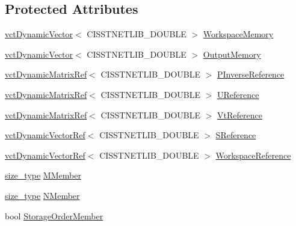 \subsection*{Protected Attributes}
\begin{DoxyCompactItemize}
\item 
\hyperlink{classvct_dynamic_vector}{vct\+Dynamic\+Vector}$<$ C\+I\+S\+S\+T\+N\+E\+T\+L\+I\+B\+\_\+\+D\+O\+U\+B\+L\+E $>$ \hyperlink{classnmr_p_inverse_dynamic_data_a799d81175e96446fe8ab3553befd26ee}{Workspace\+Memory}
\item 
\hyperlink{classvct_dynamic_vector}{vct\+Dynamic\+Vector}$<$ C\+I\+S\+S\+T\+N\+E\+T\+L\+I\+B\+\_\+\+D\+O\+U\+B\+L\+E $>$ \hyperlink{classnmr_p_inverse_dynamic_data_ac1c4149267a493ae2077a77ebe33224a}{Output\+Memory}
\end{DoxyCompactItemize}
{\bf }\par
\begin{DoxyCompactItemize}
\item 
\hyperlink{classvct_dynamic_matrix_ref}{vct\+Dynamic\+Matrix\+Ref}$<$ C\+I\+S\+S\+T\+N\+E\+T\+L\+I\+B\+\_\+\+D\+O\+U\+B\+L\+E $>$ \hyperlink{classnmr_p_inverse_dynamic_data_a14a45576194a4b72f980276df04b3fd8}{P\+Inverse\+Reference}
\item 
\hyperlink{classvct_dynamic_matrix_ref}{vct\+Dynamic\+Matrix\+Ref}$<$ C\+I\+S\+S\+T\+N\+E\+T\+L\+I\+B\+\_\+\+D\+O\+U\+B\+L\+E $>$ \hyperlink{classnmr_p_inverse_dynamic_data_a6241a303eaf9bfaf0d0c705690855d55}{U\+Reference}
\item 
\hyperlink{classvct_dynamic_matrix_ref}{vct\+Dynamic\+Matrix\+Ref}$<$ C\+I\+S\+S\+T\+N\+E\+T\+L\+I\+B\+\_\+\+D\+O\+U\+B\+L\+E $>$ \hyperlink{classnmr_p_inverse_dynamic_data_a7e7d03c38c284a81d84ba35383acf594}{Vt\+Reference}
\item 
\hyperlink{classvct_dynamic_vector_ref}{vct\+Dynamic\+Vector\+Ref}$<$ C\+I\+S\+S\+T\+N\+E\+T\+L\+I\+B\+\_\+\+D\+O\+U\+B\+L\+E $>$ \hyperlink{classnmr_p_inverse_dynamic_data_a7d2da272cbc56f92c25264181b319330}{S\+Reference}
\item 
\hyperlink{classvct_dynamic_vector_ref}{vct\+Dynamic\+Vector\+Ref}$<$ C\+I\+S\+S\+T\+N\+E\+T\+L\+I\+B\+\_\+\+D\+O\+U\+B\+L\+E $>$ \hyperlink{classnmr_p_inverse_dynamic_data_af51319d4e7f6a0693f3f23ed52220b5a}{Workspace\+Reference}
\end{DoxyCompactItemize}

{\bf }\par
\begin{DoxyCompactItemize}
\item 
\hyperlink{classnmr_p_inverse_dynamic_data_a059041cc0fb800515bffe5bb351b01cb}{size\+\_\+type} \hyperlink{classnmr_p_inverse_dynamic_data_a747c7b9fb8208d7a1a1b780e5fb0fb55}{M\+Member}
\item 
\hyperlink{classnmr_p_inverse_dynamic_data_a059041cc0fb800515bffe5bb351b01cb}{size\+\_\+type} \hyperlink{classnmr_p_inverse_dynamic_data_a1ba9d083e553858b17f7ec109261223e}{N\+Member}
\item 
bool \hyperlink{classnmr_p_inverse_dynamic_data_aa4810eb93febb93966e173a81b32f1ff}{Storage\+Order\+Member}
\end{DoxyCompactItemize}

